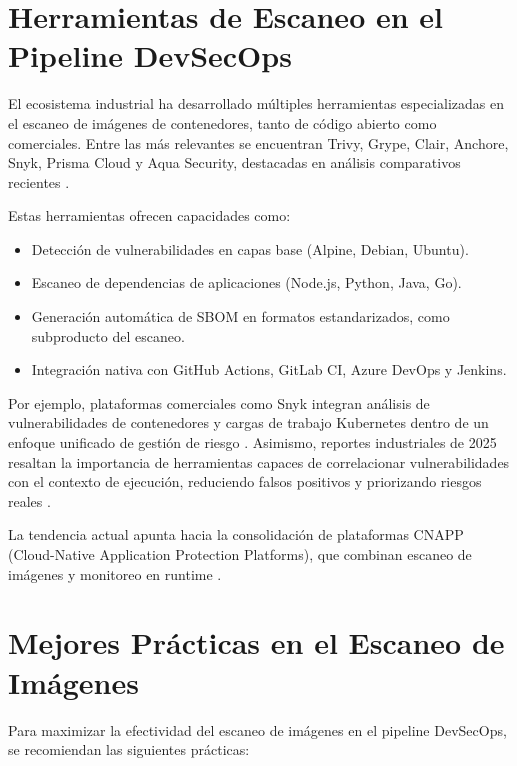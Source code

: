 \documentclass[journal]{IEEEtran}
\begin{document}
\section{Herramientas de Escaneo en el Pipeline DevSecOps}

El ecosistema industrial ha desarrollado múltiples herramientas especializadas en el escaneo de imágenes de contenedores, tanto de código abierto como comerciales. Entre las más relevantes se encuentran Trivy, Grype, Clair, Anchore, Snyk, Prisma Cloud y Aqua Security, destacadas en análisis comparativos recientes \cite{ref4,ref5}.

Estas herramientas ofrecen capacidades como:

\begin{itemize}
    \item Detección de vulnerabilidades en capas base (Alpine, Debian, Ubuntu).

    \item Escaneo de dependencias de aplicaciones (Node.js, Python, Java, Go).

    \item Generación automática de SBOM en formatos estandarizados, como subproducto del escaneo.

    \item Integración nativa con GitHub Actions, GitLab CI, Azure DevOps y Jenkins.

\end{itemize}

Por ejemplo, plataformas comerciales como Snyk integran análisis de vulnerabilidades de contenedores y cargas de trabajo Kubernetes dentro de un enfoque unificado de gestión de riesgo \cite{ref6}. Asimismo, reportes industriales de 2025 resaltan la importancia de herramientas capaces de correlacionar vulnerabilidades con el contexto de ejecución, reduciendo falsos positivos y priorizando riesgos reales \cite{ref5}.

La tendencia actual apunta hacia la consolidación de plataformas CNAPP (Cloud-Native Application Protection Platforms), que combinan escaneo de imágenes y monitoreo en runtime \cite{ref4,ref5}.

\section{Mejores Prácticas en el Escaneo de Imágenes}

Para maximizar la efectividad del escaneo de imágenes en el pipeline DevSecOps, se recomiendan las siguientes prácticas:
\end{document}
